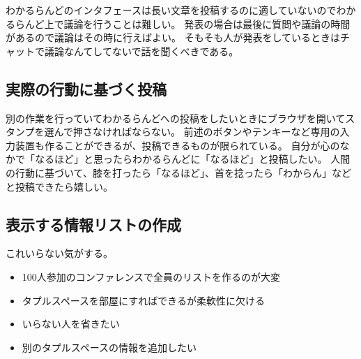 わかるらんどのインタフェースは長い文章を投稿するのに適していないのでわかるらんど上で議論を行うことは難しい。
発表の場合は最後に質問や議論の時間があるので議論はその時に行えばよい。
そもそも人が発表をしているときはチャットで議論なんてしてないで話を聞くべきである。

\subsection{実際の行動に基づく投稿}

別の作業を行っていてわかるらんどへの投稿をしたいときにブラウザを開いてスタンプを選んで押さなければならない。
前述のボタンやテンキーなど専用の入力装置も作ることができるが、投稿できるものが限られている。
自分が心のなかで「なるほど」と思ったらわかるらんどに「なるほど」と投稿したい。
人間の行動に基づいて、膝を打ったら「なるほど」、首を捻ったら「わからん」などと投稿できたら嬉しい。

\subsection{表示する情報リストの作成}

これいらない気がする。

\begin{itemize}
\item 100人参加のコンファレンスで全員のリストを作るのが大変
\item タプルスペースを部屋にすればできるが柔軟性に欠ける
\item いらない人を省きたい
\item 別のタプルスペースの情報を追加したい
\end{itemize}